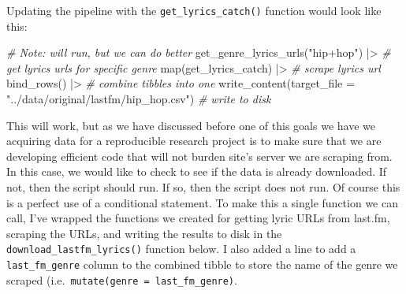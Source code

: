 \documentclass[
  letterpaper,
]{latex/krantz}
\newenvironment{Shaded}{\begin{snugshade}}{\end{snugshade}}
\newcommand{\AttributeTok}[1]{\textcolor[rgb]{0.00,0.00,0.00}{#1}}
\newcommand{\CommentTok}[1]{\textcolor[rgb]{0.00,0.00,0.00}{\textit{#1}}}
\newcommand{\FunctionTok}[1]{\textcolor[rgb]{0.00,0.00,0.00}{#1}}
\newcommand{\NormalTok}[1]{\textcolor[rgb]{0.00,0.00,0.00}{#1}}
\newcommand{\SpecialCharTok}[1]{\textcolor[rgb]{0.00,0.00,0.00}{#1}}
\newcommand{\StringTok}[1]{\textcolor[rgb]{0.00,0.00,0.00}{#1}}
\begin{document}
Updating the pipeline with the \texttt{get\_lyrics\_catch()} function
would look like this:

\begin{Shaded}
\begin{Highlighting}[]
\CommentTok{\# Note: will run, but we can do better}
\FunctionTok{get\_genre\_lyrics\_urls}\NormalTok{(}\StringTok{"hip+hop"}\NormalTok{) }\SpecialCharTok{|\textgreater{}} \CommentTok{\# get lyrics urls for specific genre}
  \FunctionTok{map}\NormalTok{(get\_lyrics\_catch) }\SpecialCharTok{|\textgreater{}}  \CommentTok{\# scrape lyrics url}
  \FunctionTok{bind\_rows}\NormalTok{() }\SpecialCharTok{|\textgreater{}} \CommentTok{\# combine tibbles into one}
  \FunctionTok{write\_content}\NormalTok{(}\AttributeTok{target\_file =} \StringTok{"../data/original/lastfm/hip\_hop.csv"}\NormalTok{) }\CommentTok{\# write to disk}
\end{Highlighting}
\end{Shaded}

This will work, but as we have discussed before one of this goals we
have we acquiring data for a reproducible research project is to make
sure that we are developing efficient code that will not burden site's
server we are scraping from. In this case, we would like to check to see
if the data is already downloaded. If not, then the script should run.
If so, then the script does not run. Of course this is a perfect use of
a conditional statement. To make this a single function we can call,
I've wrapped the functions we created for getting lyric URLs from
last.fm, scraping the URLs, and writing the results to disk in the
\texttt{download\_lastfm\_lyrics()} function below. I also added a line
to add a \texttt{last\_fm\_genre} column to the combined tibble to store
the name of the genre we scraped
(i.e.~\texttt{mutate(genre\ =\ last\_fm\_genre)}.
\end{document}
